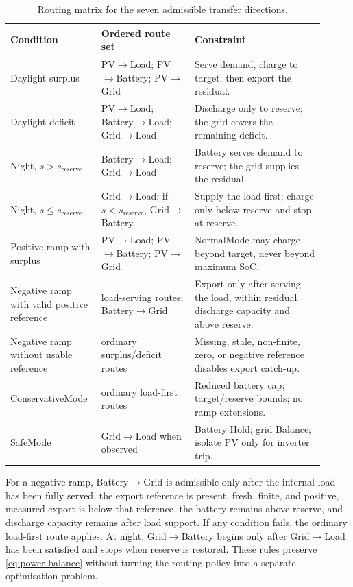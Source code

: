 \documentclass[
	letterpaper,
	10pt,
	unnumberedsections,
	twoside,
]{LTJournalArticle}
\begin{document}
\begin{table}[H]
\centering
\footnotesize
\begin{tabular}{@{}L{0.23\linewidth}L{0.29\linewidth}L{0.39\linewidth}@{}}
\toprule
\textbf{Condition} & \textbf{Ordered route set} & \textbf{Constraint} \\
\midrule
Daylight surplus & PV$\to$Load; PV$\to$Battery; PV$\to$Grid & Serve demand, charge to target, then export the residual. \\
Daylight deficit & PV$\to$Load; Battery$\to$Load; Grid$\to$Load & Discharge only to reserve; the grid covers the remaining deficit. \\
Night, $s>s_{\mathrm{reserve}}$ & Battery$\to$Load; Grid$\to$Load & Battery serves demand to reserve; the grid supplies the residual. \\
Night, $s\leq s_{\mathrm{reserve}}$ & Grid$\to$Load; if $s<s_{\mathrm{reserve}}$, Grid$\to$Battery & Supply the load first; charge only below reserve and stop at reserve. \\
Positive ramp with surplus & PV$\to$Load; PV$\to$Battery; PV$\to$Grid & NormalMode may charge beyond target, never beyond maximum SoC. \\
Negative ramp with valid positive reference & load-serving routes; Battery$\to$Grid & Export only after serving the load, within residual discharge capacity and above reserve. \\
Negative ramp without usable reference & ordinary surplus/deficit routes & Missing, stale, non-finite, zero, or negative reference disables export catch-up. \\
ConservativeMode & ordinary load-first routes & Reduced battery cap; target/reserve bounds; no ramp extensions. \\
SafeMode & Grid$\to$Load when observed & Battery Hold; grid Balance; isolate PV only for inverter trip. \\
\bottomrule
\end{tabular}
\caption{Routing matrix for the seven admissible transfer directions.}
\label{tab:routing}
\end{table}

For a negative ramp, Battery$\to$Grid is admissible only after the internal load has been fully served, the export reference is present, fresh, finite, and positive, measured export is below that reference, the battery remains above reserve, and discharge capacity remains after load support. If any condition fails, the ordinary load-first route applies. At night, Grid$\to$Battery begins only after Grid$\to$Load has been satisfied and stops when reserve is restored. These rules preserve \autoref{eq:power-balance} without turning the routing policy into a separate optimisation problem.

\printbibliography
\end{document}
